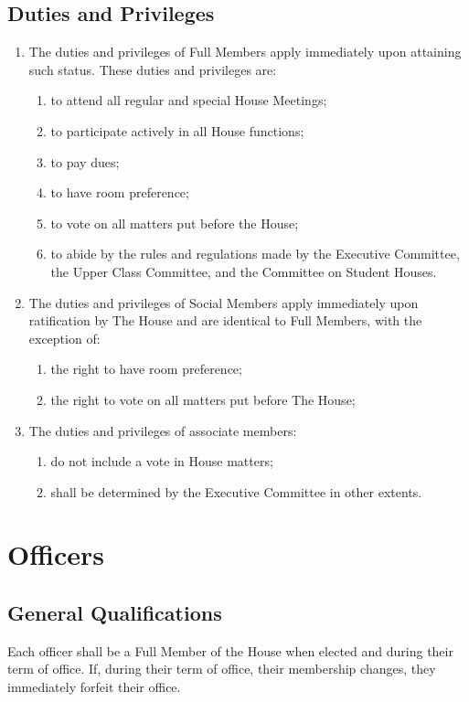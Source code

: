 \documentclass[10pt]{article} %
\begin{document}
\subsection{Duties and Privileges}
\begin{enumerate}
\item The duties and privileges of Full Members apply immediately upon attaining such status. These duties and privileges are:
\begin{enumerate}
\item to attend all regular and special House Meetings;
\item to participate actively in all House functions;
\item to pay dues;
\item to have room preference;
\item to vote on all matters put before the House;
\item to abide by the rules and regulations made by the Executive Committee, the Upper Class Committee, and the Committee on Student Houses.
\end{enumerate}
\item The duties and privileges of Social Members apply immediately upon ratification by The House and are identical to Full Members, with the exception of:
\begin{enumerate}
\item the right to have room preference;
\item the right to vote on all matters put before The House;
\end{enumerate}
\item The duties and privileges of associate members:
\begin{enumerate}
\item do not include a vote in House matters;
\item shall be determined by the Executive Committee in other extents.
\end{enumerate}
\end{enumerate}
\section{Officers}
\subsection{General Qualifications}
Each officer shall be a Full Member of the House when elected and during their term of office. If, during their term of office, their membership changes, they immediately forfeit their office.
\end{document}
